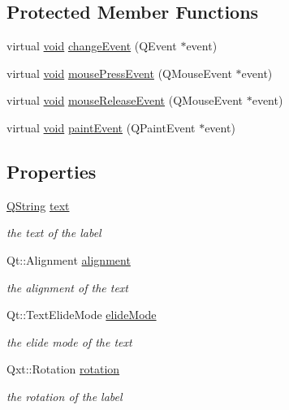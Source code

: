 \subsection*{Protected Member Functions}
\begin{DoxyCompactItemize}
\item 
virtual \hyperlink{group___u_a_v_objects_plugin_ga444cf2ff3f0ecbe028adce838d373f5c}{void} \hyperlink{class_qxt_label_aee5b8169c33b0b45cd70580a7aead727}{change\-Event} (Q\-Event $\ast$event)
\item 
virtual \hyperlink{group___u_a_v_objects_plugin_ga444cf2ff3f0ecbe028adce838d373f5c}{void} \hyperlink{class_qxt_label_ab75783d9bf9897dca2dbc5f480bc4e8f}{mouse\-Press\-Event} (Q\-Mouse\-Event $\ast$event)
\item 
virtual \hyperlink{group___u_a_v_objects_plugin_ga444cf2ff3f0ecbe028adce838d373f5c}{void} \hyperlink{class_qxt_label_a1958c6452ccc2e8b9214a7c8664258b2}{mouse\-Release\-Event} (Q\-Mouse\-Event $\ast$event)
\item 
virtual \hyperlink{group___u_a_v_objects_plugin_ga444cf2ff3f0ecbe028adce838d373f5c}{void} \hyperlink{class_qxt_label_a3900de04006b653308faef81c60ee737}{paint\-Event} (Q\-Paint\-Event $\ast$event)
\end{DoxyCompactItemize}
\subsection*{Properties}
\begin{DoxyCompactItemize}
\item 
\hyperlink{group___u_a_v_objects_plugin_gab9d252f49c333c94a72f97ce3105a32d}{Q\-String} \hyperlink{class_qxt_label_a62d0ce110fe3e51ea6ea82cd8e60d430}{text}
\begin{DoxyCompactList}\small\item\em the text of the label \end{DoxyCompactList}\item 
Qt\-::\-Alignment \hyperlink{class_qxt_label_a567b7e5e6a5ef51f72369198fd29b80f}{alignment}
\begin{DoxyCompactList}\small\item\em the alignment of the text \end{DoxyCompactList}\item 
Qt\-::\-Text\-Elide\-Mode \hyperlink{class_qxt_label_a1af8965c7a5ca2605fdeb7c99cb41ad1}{elide\-Mode}
\begin{DoxyCompactList}\small\item\em the elide mode of the text \end{DoxyCompactList}\item 
Qxt\-::\-Rotation \hyperlink{class_qxt_label_afac17750ce1b4f63bf868dd239aeb2f2}{rotation}
\begin{DoxyCompactList}\small\item\em the rotation of the label \end{DoxyCompactList}\end{DoxyCompactItemize}


